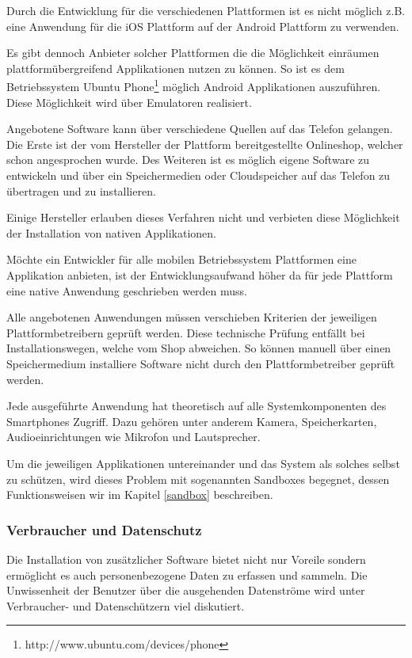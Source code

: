 Durch die Entwicklung für die verschiedenen Plattformen ist es nicht möglich z.B. eine Anwendung für die iOS Plattform auf der Android Plattform zu verwenden.

Es gibt dennoch Anbieter solcher Plattformen die die Möglichkeit einräumen plattformübergreifend Applikationen nutzen zu können. So ist es dem Betriebssystem Ubuntu Phone\footnote{http://www.ubuntu.com/devices/phone} möglich Android Applikationen auszuführen. Diese Möglichkeit wird über Emulatoren realisiert. 

Angebotene Software kann über verschiedene Quellen auf das Telefon gelangen. Die Erste ist der vom Hersteller der Plattform bereitgestellte Onlineshop, welcher schon angesprochen wurde. Des Weiteren ist es möglich eigene Software zu entwickeln und über ein Speichermedien oder Cloudspeicher auf das Telefon zu übertragen und zu installieren.

Einige Hersteller erlauben dieses Verfahren nicht und verbieten diese Möglichkeit der Installation von nativen Applikationen.

Möchte ein Entwickler für alle mobilen Betriebssystem Plattformen eine Applikation anbieten, ist der Entwicklungsaufwand höher da für jede Plattform eine native Anwendung geschrieben werden muss.

Alle angebotenen Anwendungen müssen verschieben Kriterien der jeweiligen Plattformbetreibern geprüft werden. Diese technische Prüfung entfällt bei Installationswegen, welche vom Shop abweichen. So können manuell über einen Speichermedium installiere Software nicht durch den Plattformbetreiber geprüft werden.

Jede ausgeführte Anwendung hat theoretisch auf alle Systemkomponenten des Smartphones Zugriff. Dazu gehören unter anderem Kamera, Speicherkarten, Audioeinrichtungen wie Mikrofon und Lautsprecher.

Um die jeweiligen Applikationen untereinander und das System als solches selbst zu schützen, wird dieses Problem mit sogenannten Sandboxes begegnet, dessen Funktionsweisen wir im Kapitel \ref{sandbox} beschreiben.

\subsubsection{Verbraucher und Datenschutz}

Die Installation von zusätzlicher Software bietet nicht nur Voreile sondern ermöglicht es auch personenbezogene Daten zu erfassen und sammeln. Die Unwissenheit der Benutzer über die ausgehenden Datenströme wird unter Verbraucher- und Datenschützern viel diskutiert.

